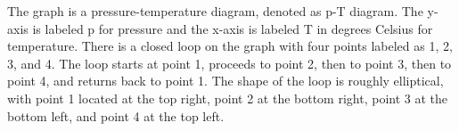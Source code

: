 The graph is a pressure-temperature diagram, denoted as p-T diagram. The y-axis is labeled p for pressure and the x-axis is labeled T in degrees Celsius for temperature. There is a closed loop on the graph with four points labeled as 1, 2, 3, and 4. The loop starts at point 1, proceeds to point 2, then to point 3, then to point 4, and returns back to point 1. The shape of the loop is roughly elliptical, with point 1 located at the top right, point 2 at the bottom right, point 3 at the bottom left, and point 4 at the top left.